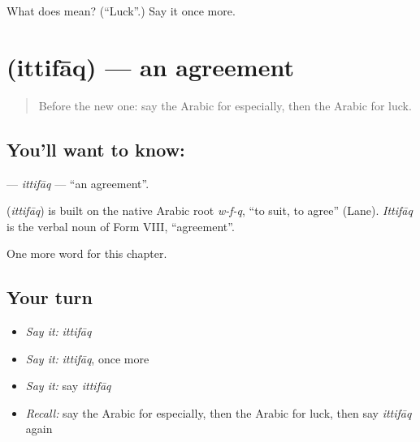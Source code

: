 \begin{tcolorbox}[breakable,colback=teal!4,colframe=teal!35!black,title={Before you move on}]
What does  mean? (\textquotedblleft{}Luck\textquotedblright{}.) Say it once more.
\end{tcolorbox}
\section[\texorpdfstring{\ar{اتفاق} (ittifāq)}{اتفاق (ittifāq)}]{ (ittifāq) — an agreement}

\label{lesson:AR-C239-ittifaq}



\begin{quote}
Before the new one: say the Arabic for especially, then the Arabic for luck.
\end{quote}

\subsection*{You'll want to know: }
\textbf{} — \emph{ittifāq} — \textquotedblleft{}an agreement\textquotedblright{}.

\begin{cousinweb}
\textbf{} (\emph{ittifāq}) is built on the native Arabic root \emph{w-f-q}, \textquotedblleft{}to suit, to agree\textquotedblright{} (Lane). \emph{Ittifāq} is the verbal noun of Form VIII, \textquotedblleft{}agreement\textquotedblright{}.
\end{cousinweb}

\begin{grammarlens}[title={What you've built}]
One more word for this chapter.
\end{grammarlens}

\subsection*{Your turn}
\begin{itemize}
\raggedright
  \item \emph{Say it:} \emph{ittifāq}
  \item \emph{Say it:} \emph{ittifāq}, once more
  \item \emph{Say it:} say \emph{ittifāq}
  \item \emph{Recall:} say the Arabic for especially, then the Arabic for luck, then say \emph{ittifāq} again
\end{itemize}

